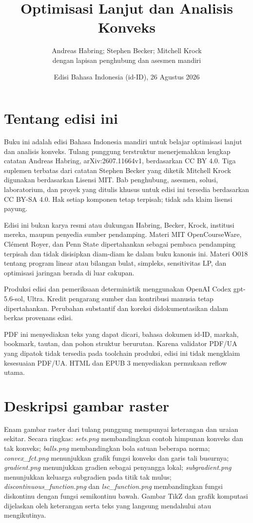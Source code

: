 \documentclass[11pt,a4paper,oneside,openany]{book}
\title{Optimisasi Lanjut dan Analisis Konveks}
\author{Andreas Habring; Stephen Becker; Mitchell Krock\\
  dengan lapisan penghubung dan asesmen mandiri}
\date{Edisi Bahasa Indonesia (id-ID), 26 Agustus 2026}
\begin{document}

\hypersetup{pageanchor=false}
\frontmatter
\maketitle
\hypersetup{pageanchor=true}
\chapter*{Tentang edisi ini}
Buku ini adalah edisi Bahasa Indonesia mandiri untuk belajar optimisasi lanjut
dan analisis konveks. Tulang punggung terstruktur menerjemahkan lengkap catatan
Andreas Habring, arXiv:2607.11664v1, berdasarkan CC BY 4.0. Tiga suplemen
terbatas dari catatan Stephen Becker yang diketik Mitchell Krock digunakan
berdasarkan Lisensi MIT. Bab penghubung, asesmen, solusi, laboratorium, dan
proyek yang ditulis khusus untuk edisi ini tersedia berdasarkan CC BY-SA 4.0.
Hak setiap komponen tetap terpisah; tidak ada klaim lisensi payung.

Edisi ini bukan karya resmi atau dukungan Habring, Becker, Krock, institusi
mereka, maupun penyedia sumber pendamping. Materi MIT OpenCourseWare, Clément
Royer, dan Penn State dipertahankan sebagai pembaca pendamping terpisah dan
tidak disisipkan diam-diam ke dalam buku kanonis ini. Materi O018 tentang
program linear atau bilangan bulat, simpleks, sensitivitas LP, dan optimisasi
jaringan berada di luar cakupan.

Produksi edisi dan pemeriksaan deterministik menggunakan OpenAI Codex
gpt-5.6-sol, Ultra. Kredit pengarang sumber dan kontribusi manusia tetap
dipertahankan. Perubahan substantif dan koreksi didokumentasikan dalam berkas
provenans edisi.

PDF ini menyediakan teks yang dapat dicari, bahasa dokumen id-ID, markah,
bookmark, tautan, dan pohon struktur berurutan. Karena validator PDF/UA yang
dipatok tidak tersedia pada toolchain produksi, edisi ini tidak mengklaim
kesesuaian PDF/UA. HTML dan EPUB 3 menyediakan permukaan reflow utama.

\chapter*{Deskripsi gambar raster}
Enam gambar raster dari tulang punggung mempunyai keterangan dan uraian
sekitar. Secara ringkas: \emph{sets.png} membandingkan contoh himpunan konveks
dan tak konveks; \emph{balls.png} membandingkan bola satuan beberapa norma;
\emph{convex\_fct.png} menunjukkan grafik fungsi konveks dan garis tali
busurnya; \emph{gradient.png} menunjukkan gradien sebagai penyangga lokal;
\emph{subgradient.png} menunjukkan keluarga subgradien pada titik tak mulus;
\emph{discontinuous\_function.png} dan \emph{lsc\_function.png} membandingkan
fungsi diskontinu dengan fungsi semikontinu bawah. Gambar TikZ dan grafik
komputasi dijelaskan oleh keterangan serta teks yang langsung mendahului atau
mengikutinya.
\end{document}

